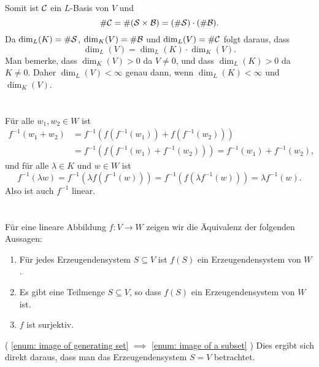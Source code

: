 \documentclass[a4paper,10pt]{scrartcl}
\begin{document}
Somit ist $\mathcal{C}$ ein $L$-Basis von $V$ und
\[
 \# \mathcal{C} = \#(\mathcal{S} \times \mathcal{B}) = (\# \mathcal{S}) \cdot (\# \mathcal{B}).
\]
Da $\dim_L(K) = \# \mathcal{S}$, $\dim_K(V) = \# \mathcal{B}$ und $\dim_L(V) = \# \mathcal{C}$ folgt daraus, dass
\[
 \dim_L(V) = \dim_L(K) \cdot \dim_K(V).
\]
Man bemerke, dass $\dim_K(V) > 0$ da $V \neq 0$, und dass $\dim_L(K) > 0$ da $K \neq 0$. Daher $\dim_L(V) < \infty$ genau dann, wenn $\dim_L(K) < \infty$ und $\dim_K(V)$.













\section{}
Für alle $w_1, w_2 \in W$ ist
\begin{align*}
 f^{-1}(w_1 + w_2)
 &= f^{-1}(f(f^{-1}(w_1)) + f(f^{-1}(w_2))) \\
 &= f^{-1}(f(f^{-1}(w_1) + f^{-1}(w_2)))
 = f^{-1}(w_1) + f^{-1}(w_2),
\end{align*}
und für alle $\lambda \in K$ und $w \in W$ ist
\[
 f^{-1}(\lambda w)
 = f^{-1}(\lambda f(f^{-1}(w)))
 = f^{-1}(f(\lambda f^{-1}(w)))
 = \lambda f^{-1}(w).
\]
Also ist auch $f^{-1}$ linear.








\section{}
Für eine lineare Abbildung $f \colon V \to W$ zeigen wir die Äquivalenz der folgenden Aussagen:

\begin{enumerate}[label=(\roman*)]
 \item\label{enum: image of generating set}
  Für jedes Erzeugendensystem $S \subseteq V$ ist $f(S)$ ein Erzeugendensystem von $W$.
 \item\label{enum: image of a subset}
  Es gibt eine Teilmenge $S \subseteq V$, so dass $f(S)$ ein Erzeugendensystem von $W$ ist.
 \item\label{enum: surjective}
  $f$ ist surjektiv.
\end{enumerate}


( \ref{enum: image of generating set} $\implies$ \ref{enum: image of a subset} ) Dies ergibt sich direkt daraus, dass man das Erzeugendensystem $S = V$ betrachtet.
\end{document}
